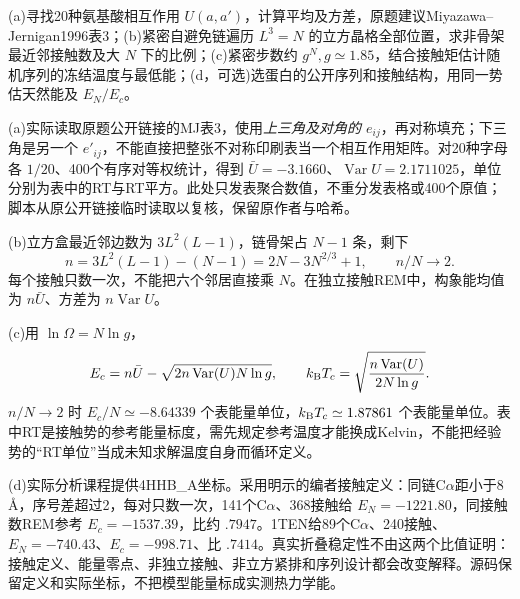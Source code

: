 \begin{exercise}
(a)寻找20种氨基酸相互作用 $U(a,a')$，计算平均及方差，原题建议Miyazawa--Jernigan1996表3；(b)紧密自避免链遍历 $L^3=N$ 的立方晶格全部位置，求非骨架最近邻接触数及大 $N$ 下的比例；(c)紧密步数约 $g^N,g\simeq1.85$，结合接触矩估计随机序列的冻结温度与最低能；(d，可选)选蛋白的公开序列和接触结构，用同一势估天然能及 $E_N/E_c$。
\end{exercise}
\begin{solution}
(a)实际读取原题公开链接的MJ表3，使用\emph{上三角及对角的 $e_{ij}$}，再对称填充；下三角是另一个 $e'_{ij}$，不能直接把整张不对称印刷表当一个相互作用矩阵。对20种字母各 $1/20$、400个有序对等权统计，得到 $\bar U=-3.1660$、$\operatorname{Var}U=2.1711025$，单位分别为表中的RT与RT平方。此处只发表聚合数值，不重分发表格或400个原值；脚本从原公开链接临时读取以复核，保留原作者与哈希。

(b)立方盒最近邻边数为 $3L^2(L-1)$，链骨架占 $N-1$ 条，剩下
\[
n=3L^2(L-1)-(N-1)=2N-3N^{2/3}+1,\qquad n/N\to2.
\]
每个接触只数一次，不能把六个邻居直接乘 $N$。在独立接触REM中，构象能均值为 $n\bar U$、方差为 $n\operatorname{Var}U$。

(c)用 $\ln\Omega=N\ln g$，
\[
E_c=n\bar U-\sqrt{2n\operatorname{Var}(U)N\ln g},\qquad
k_{\mathrm B} T_c=\sqrt{\frac{n\operatorname{Var}(U)}{2N\ln g}}.
\]
$n/N\to2$ 时 $E_c/N\simeq-8.64339$ 个表能量单位，$k_{\mathrm B} T_c\simeq1.87861$ 个表能量单位。表中RT是接触势的参考能量标度，需先规定参考温度才能换成Kelvin，不能把经验势的“RT单位”当成未知求解温度自身而循环定义。

(d)实际分析课程提供4HHB\_A坐标。采用明示的编者接触定义：同链C$\alpha$距小于8 \AA{}，序号差超过2，每对只数一次，141个C$\alpha$、368接触给 $E_N=-1221.80$，同接触数REM参考 $E_c=-1537.39$，比约 $.7947$。1TEN给89个C$\alpha$、240接触、$E_N=-740.43$、$E_c=-998.71$、比 $.7414$。真实折叠稳定性不由这两个比值证明：接触定义、能量零点、非独立接触、非立方紧排和序列设计都会改变解释。源码保留定义和实际坐标，不把模型能量标成实测热力学能。
\end{solution}

